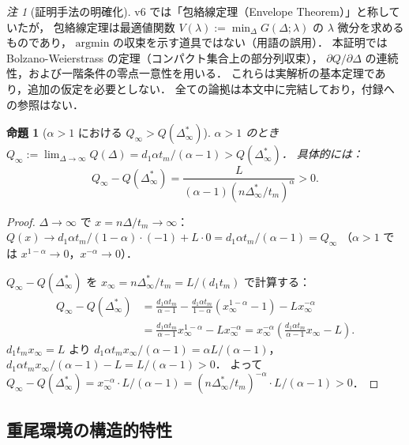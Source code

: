 \documentclass[12pt,a4paper]{article}
\theoremstyle{plain}
\newtheorem{proposition}[theorem]{命題}
\theoremstyle{definition}
\theoremstyle{remark}
\newtheorem{remark}[theorem]{注}
\newcommand{\Dinf}{\Delta^{*}_{\infty}}
\begin{document}
\begin{remark}[証明手法の明確化]
v6 では「包絡線定理（Envelope Theorem）」と称していたが，
包絡線定理は最適値関数 $V(\lambda):=\min_\Delta G(\Delta;\lambda)$ の $\lambda$ 微分を求めるものであり，
$\mathrm{argmin}$ の収束を示す道具ではない（用語の誤用）．
本証明では Bolzano-Weierstrass の定理（コンパクト集合上の部分列収束），
$\partial Q/\partial\Delta$ の連続性，および一階条件の零点一意性を用いる．
これらは実解析の基本定理であり，追加の仮定を必要としない．
全ての論拠は本文中に完結しており，付録への参照はない．
\end{remark}

\begin{proposition}[$\alpha>1$ における $Q_\infty>Q(\Dinf)$]\label{prop:gap_exists}
$\alpha>1$ のとき $Q_\infty:=\lim_{\Delta\to\infty}Q(\Delta)=d_1\alpha t_m/(\alpha-1)>Q(\Dinf)$．
具体的には：
\begin{equation}\label{eq:gap_formula}
Q_\infty-Q(\Dinf)=\frac{L}{(\alpha-1)(n\Dinf/t_m)^{\alpha}}>0.
\end{equation}
\end{proposition}

\begin{proof}
$\Delta\to\infty$ で $x=n\Delta/t_m\to\infty$：
$Q(x)\to d_1\alpha t_m/(1-\alpha)\cdot(-1)+L\cdot0=d_1\alpha t_m/(\alpha-1)=Q_\infty$
（$\alpha>1$ では $x^{1-\alpha}\to0$，$x^{-\alpha}\to0$）．

$Q_\infty-Q(\Dinf)$ を $x_\infty=n\Dinf/t_m=L/(d_1 t_m)$ で計算する：
\begin{align*}
Q_\infty-Q(\Dinf)
&=\frac{d_1\alpha t_m}{\alpha-1}-\frac{d_1\alpha t_m}{1-\alpha}(x_\infty^{1-\alpha}-1)-Lx_\infty^{-\alpha}\\
&=\frac{d_1\alpha t_m}{\alpha-1}x_\infty^{1-\alpha}-Lx_\infty^{-\alpha}
=x_\infty^{-\alpha}\!\left(\frac{d_1\alpha t_m}{\alpha-1}x_\infty-L\right).
\end{align*}
$d_1 t_m x_\infty=L$ より $d_1\alpha t_m x_\infty/(\alpha-1)=\alpha L/(\alpha-1)$，
$d_1\alpha t_m x_\infty/(\alpha-1)-L=L/(\alpha-1)>0$．
よって $Q_\infty-Q(\Dinf)=x_\infty^{-\alpha}\cdot L/(\alpha-1)=(n\Dinf/t_m)^{-\alpha}\cdot L/(\alpha-1)>0$．
\end{proof}

\subsection{重尾環境の構造的特性}
\end{document}
